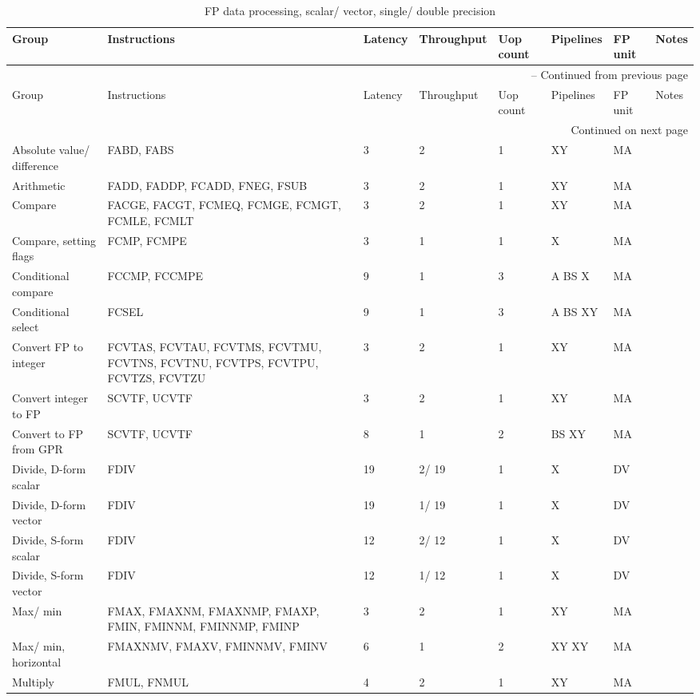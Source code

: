 \begin{longtable}{|p{1in}|p{1in}|l|l|l|p{1in}|l|p{1in}|}
\caption{FP data processing, scalar/ vector, single/ double precision} \\
\hline
Group & Instructions & Latency & Throughput & Uop count & Pipelines & FP unit & Notes\\
\hline
\endfirsthead
\hline
\multicolumn{8}{|r|}{{\tablename\ \thetable{} -- Continued from previous page}} \\
\hline
Group & Instructions & Latency & Throughput & Uop count & Pipelines & FP unit & Notes\\
\hline
\endhead
\hline
\multicolumn{8}{|r|}{{Continued on next page}} \\
\hline
\endfoot
\hline
\endlastfoot
Absolute value/ difference & FABD, FABS & 3 & 2 & 1 & XY & MA & \\
\hline
Arithmetic & FADD, FADDP, FCADD, FNEG, FSUB & 3 & 2 & 1 & XY & MA & \\
\hline
Compare & FACGE, FACGT, FCMEQ, FCMGE, FCMGT, FCMLE, FCMLT & 3 & 2 & 1 & XY & MA & \\
\hline
Compare, setting flags & FCMP, FCMPE & 3 & 1 & 1 & X & MA & \\
\hline
Conditional compare & FCCMP, FCCMPE & 9 & 1 & 3 & A BS X & MA & \\
\hline
Conditional select & FCSEL & 9 & 1 & 3 & A BS XY & MA & \\
\hline
Convert FP to integer & FCVTAS, FCVTAU, FCVTMS, FCVTMU, FCVTNS, FCVTNU, FCVTPS, FCVTPU, FCVTZS, FCVTZU & 3 & 2 & 1 & XY & MA & \\
\hline
Convert integer to FP & SCVTF, UCVTF & 3 & 2 & 1 & XY & MA & \\
\hline
Convert to FP from GPR & SCVTF, UCVTF & 8 & 1 & 2 & BS XY & MA & \\
\hline
Divide, D-form scalar & FDIV & 19 & 2/ 19 & 1 & X & DV & \\
\hline
Divide, D-form vector & FDIV & 19 & 1/ 19 & 1 & X & DV & \\
\hline
Divide, S-form scalar & FDIV & 12 & 2/ 12 & 1 & X & DV & \\
\hline
Divide, S-form vector & FDIV & 12 & 1/ 12 & 1 & X & DV & \\
\hline
Max/ min & FMAX, FMAXNM, FMAXNMP, FMAXP, FMIN, FMINNM, FMINNMP, FMINP & 3 & 2 & 1 & XY & MA & \\
\hline
Max/ min, horizontal & FMAXNMV, FMAXV, FMINNMV, FMINV & 6 & 1 & 2 & XY XY & MA & \\
\hline
Multiply & FMUL, FNMUL & 4 & 2 & 1 & XY & MA & \\

\end{longtable}
